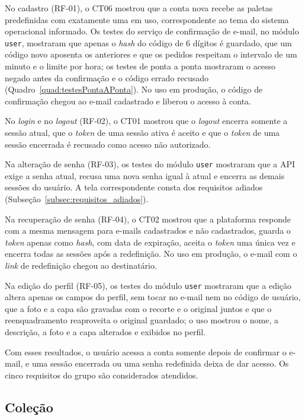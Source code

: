 No cadastro (RF-01), o CT06 mostrou que a conta nova recebe as paletas predefinidas com exatamente uma em uso, correspondente ao tema do sistema operacional
informado. Os testes do serviço de confirmação de e-mail, no módulo \texttt{user}, mostraram que apenas o \textit{hash} do código de 6 dígitos é guardado,
que um código novo aposenta os anteriores e que os pedidos respeitam o intervalo de um minuto e o limite por hora; os testes de ponta a ponta mostraram o
acesso negado antes da confirmação e o código errado recusado (Quadro~\ref{quad:testesPontaAPonta}). No uso em produção, o código de confirmação chegou ao
e-mail cadastrado e liberou o acesso à conta.

No \textit{login} e no \textit{logout} (RF-02), o CT01 mostrou que o \textit{logout} encerra somente a sessão atual, que o \textit{token} de uma sessão ativa
é aceito e que o \textit{token} de uma sessão encerrada é recusado como acesso não autorizado.

Na alteração de senha (RF-03), os testes do módulo \texttt{user} mostraram que a API exige a senha atual, recusa uma nova senha igual à atual e encerra
as demais sessões do usuário. A tela correspondente consta dos requisitos adiados (Subseção~\ref{subsec:requisitos_adiados}).

Na recuperação de senha (RF-04), o CT02 mostrou que a plataforma responde com a mesma mensagem para e-mails cadastrados e não cadastrados, guarda o
\textit{token} apenas como \textit{hash}, com data de expiração, aceita o \textit{token} uma única vez e encerra todas as sessões após a redefinição.
No uso em produção, o e-mail com o \textit{link} de redefinição chegou ao destinatário.

Na edição do perfil (RF-05), os testes do módulo \texttt{user} mostraram que a edição altera apenas os campos do perfil, sem tocar no e-mail nem no código
de usuário, que a foto e a capa são gravadas com o recorte e o original juntos e que o reenquadramento reaproveita o original guardado; o uso mostrou o
nome, a descrição, a foto e a capa alterados e exibidos no perfil.

Com esses resultados, o usuário acessa a conta somente depois de confirmar o e-mail, e uma sessão encerrada ou uma senha redefinida deixa de dar acesso.
Os cinco requisitos do grupo são considerados atendidos.

\subsection{Coleção}

